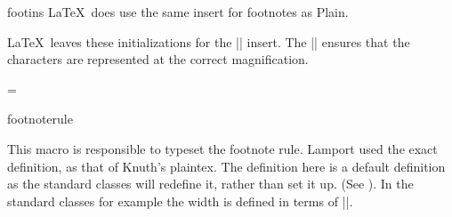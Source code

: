%
%
%
%
%
%
%
%
%
%
%
 \begin{docCommand}{footins}{}
  \LaTeX\ does use the same insert for footnotes as Plain.
    \begin{teX}
\newinsert\footins
    \end{teX}
%
 \LaTeX\ leaves these initializations for the |\footins| insert. The |\count\footins| ensures that
 the characters are represented at the correct magnification.

    \begin{teX}
\skip\footins=\bigskipamount %
\count{} %
\dimen\footins=8in %
    \end{teX}
 \end{docCommand}
%
%
 \begin{docCommand}{footnoterule}{}
 
 This macro is responsible to typeset the footnote rule. Lamport used the exact
 definition, as that of Knuth’s plaintex.  The definition here is a default definition
 as the standard classes will redefine it, rather than set it up. (See \pageref{book:footnotes}).
In the standard classes for example the width is defined in terms of |\columnwidth|.

    \begin{teX}
\def\footnoterule{\kern-3\p@
  \hrule \@width 2in \kern 2.6\p@} %
    \end{teX}
 \end{docCommand}

